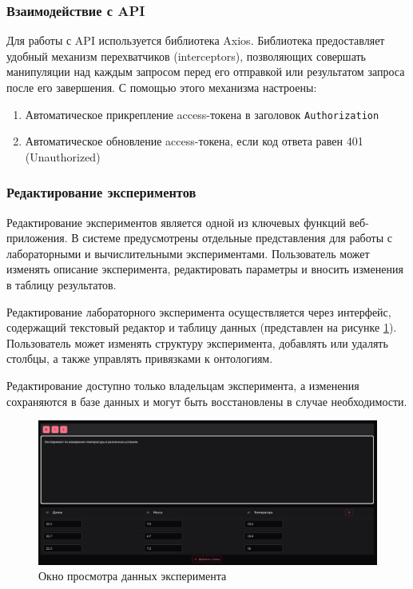 \subsubsection{Взаимодействие с API}

Для работы с API используется библиотека Axios. Библиотека предоставляет удобный механизм перехватчиков (interceptors), позволяющих совершать манипуляции над каждым запросом перед его отправкой или результатом запроса после его завершения. С помощью этого механизма настроены:
\begin{enumerate}
    \item Автоматическое прикрепление access-токена в заголовок \texttt{Authorization}
    \item Автоматическое обновление access-токена, если код ответа равен 401 (Unauthorized)
\end{enumerate}

\subsubsection{Редактирование экспериментов}

Редактирование экспериментов является одной из ключевых функций веб-приложения. В системе предусмотрены отдельные представления для работы с лабораторными и вычислительными экспериментами. Пользователь может изменять описание эксперимента, редактировать параметры и вносить изменения в таблицу результатов.

Редактирование лабораторного эксперимента осуществляется через интерфейс, содержащий текстовый редактор и таблицу данных (представлен на рисунке \ref{pic:lab_experiment_editor}). Пользователь может изменять структуру эксперимента, добавлять или удалять столбцы, а также управлять привязками к онтологиям. 


Редактирование доступно только владельцам эксперимента, а изменения сохраняются в базе данных и могут быть восстановлены в случае необходимости.

\begin{figure}[H]
    \centering
    \includegraphics[width=\linewidth]{img/experiment_view.png}
    \caption{Окно просмотра данных эксперимента}
    \label{pic:lab_experiment_editor}
\end{figure}
\vspace{0.5cm}

